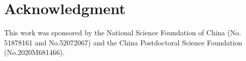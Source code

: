 \documentclass[journal]{IEEEtran}
\begin{document}

%





\section*{Acknowledgment}


This work was sponsored by the National Science Foundation of China (No. 51878161 and No.52072067) and the China Postdoctoral Science Foundation (No.2020M681466).


\ifCLASSOPTIONcaptionsoff
 \newpage
\fi
\end{document}
